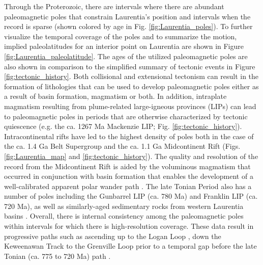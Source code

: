 \documentclass[twocolumn, switch]{article} %
\begin{document}
Through the Proterozoic, there are intervals where there are abundant paleomagnetic poles that constrain Laurentia's position and intervals when the record is sparse (shown colored by age in Fig. \ref{fig:Laurentia_poles}). To further visualize the temporal coverage of the poles and to summarize the motion, implied paleolatitudes for an interior point on Laurentia are shown in Figure \ref{fig:Laurentia_paleolatitude}. The ages of the utilized paleomagnetic poles are also shown in comparison to the simplified summary of tectonic events in Figure \ref{fig:tectonic_history}. Both collisional and extensional tectonism can result in the formation of lithologies that can be used to develop paleomagnetic poles either as a result of basin formation, magmatism or both. In addition, intraplate magmatism resulting from plume-related large-igneous provinces (LIPs) can lead to paleomagnetic poles in periods that are otherwise characterized by tectonic quiescence (e.g. the ca. 1267 Ma Mackenzie LIP; Fig. \ref{fig:tectonic_history}). Intracontinental rifts have led to the highest density of poles both in the case of the ca. 1.4 Ga Belt Supergroup and the ca. 1.1 Ga Midcontinent Rift (Figs. \ref{fig:Laurentia_map} and \ref{fig:tectonic_history}). The quality and resolution of the record from the Midcontinent Rift is aided by the voluminous magmatism that occurred in conjunction with basin formation that enables the development of a well-calibrated apparent polar wander path \citep{Swanson-Hysell2019a}. The late Tonian Period also has a number of poles including the Gunbarrel LIP (ca. 780 Ma) and Franklin LIP (ca. 720 Ma), as well as similarly-aged sedimentary rocks from western Laurentia basins \citep{Eyster2019a}. Overall, there is internal consistency among the paleomagnetic poles within intervals for which there is high-resolution coverage. These data result in progressive paths such as ascending up to the Logan Loop \citep{Robertson1971a}, down the Keweenawan Track \citep{Swanson-Hysell2019a} to the Grenville Loop \citep{McWilliams1975a} prior to a temporal gap before the late Tonian (ca. 775 to 720 Ma) path \citep{Eyster2019a}.
\end{document}
